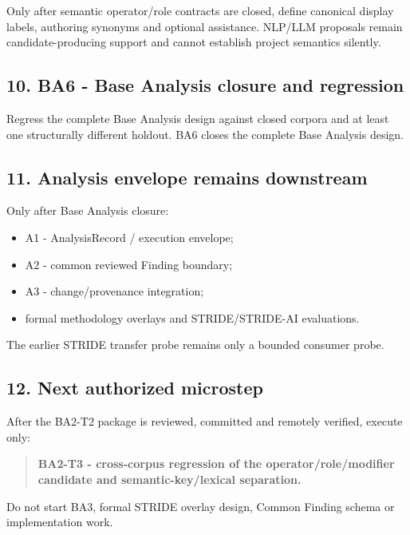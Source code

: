 \documentclass[
  10pt,
  letterpaper,
]{article}
\providecommand{\tightlist}{%
  \setlength{\itemsep}{0pt}\setlength{\parskip}{0pt}}
\begin{document}
Only after semantic operator/role contracts are closed, define canonical
display labels, authoring synonyms and optional assistance. NLP/LLM
proposals remain candidate-producing support and cannot establish
project semantics silently.

\subsection{10. BA6 - Base Analysis closure and
regression}\label{ba6---base-analysis-closure-and-regression}

Regress the complete Base Analysis design against closed corpora and at
least one structurally different holdout. BA6 closes the complete Base
Analysis design.

\subsection{11. Analysis envelope remains
downstream}\label{analysis-envelope-remains-downstream}

Only after Base Analysis closure:

\begin{itemize}
\tightlist
\item
  A1 - AnalysisRecord / execution envelope;
\item
  A2 - common reviewed Finding boundary;
\item
  A3 - change/provenance integration;
\item
  formal methodology overlays and STRIDE/STRIDE-AI evaluations.
\end{itemize}

The earlier STRIDE transfer probe remains only a bounded consumer probe.

\subsection{12. Next authorized
microstep}\label{next-authorized-microstep}

After the BA2-T2 package is reviewed, committed and remotely verified,
execute only:

\begin{quote}
\textbf{BA2-T3 - cross-corpus regression of the operator/role/modifier
candidate and semantic-key/lexical separation.}
\end{quote}

Do not start BA3, formal STRIDE overlay design, Common Finding schema or
implementation work.
\end{document}
